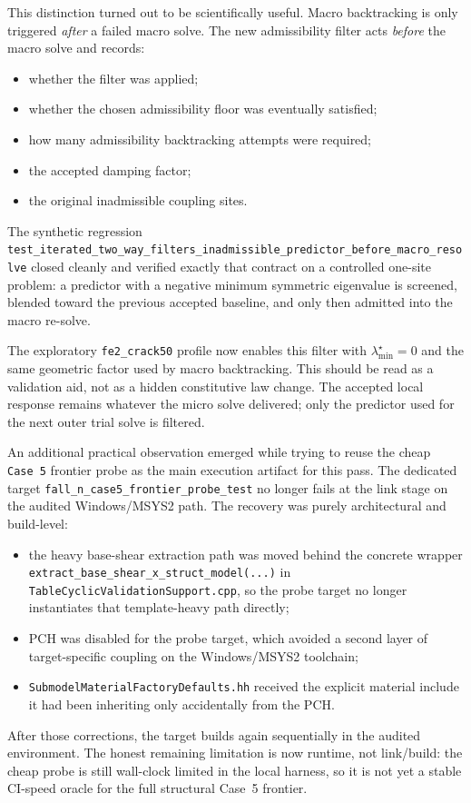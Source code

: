 This distinction turned out to be scientifically useful.  Macro backtracking is
only triggered \emph{after} a failed macro solve.  The new admissibility filter
acts \emph{before} the macro solve and records:
\begin{itemize}
  \item whether the filter was applied;
  \item whether the chosen admissibility floor was eventually satisfied;
  \item how many admissibility backtracking attempts were required;
  \item the accepted damping factor;
  \item the original inadmissible coupling sites.
\end{itemize}
The synthetic regression
\texttt{test\_iterated\_two\_way\_filters\_inadmissible\_predictor\_before\_macro\_resolve}
closed cleanly and verified exactly that contract on a controlled one-site
problem: a predictor with a negative minimum symmetric eigenvalue is screened,
blended toward the previous accepted baseline, and only then admitted into the
macro re-solve.

The exploratory \texttt{fe2\_crack50} profile now enables this filter with
\(\lambda_{\min}^{\star}=0\) and the same geometric factor used by macro
backtracking.  This should be read as a validation aid, not as a hidden
constitutive law change.  The accepted local response remains whatever the
micro solve delivered; only the predictor used for the next outer trial solve
is filtered.

An additional practical observation emerged while trying to reuse the cheap
\texttt{Case~5} frontier probe as the main execution artifact for this pass.
The dedicated target \texttt{fall\_n\_case5\_frontier\_probe\_test} no longer
fails at the link stage on the audited Windows/MSYS2 path.  The recovery was
purely architectural and build-level:
\begin{itemize}
  \item the heavy base-shear extraction path was moved behind the concrete
    wrapper \texttt{extract\_base\_shear\_x\_struct\_model(...)} in
    \texttt{TableCyclicValidationSupport.cpp}, so the probe target no longer
    instantiates that template-heavy path directly;
  \item PCH was disabled for the probe target, which avoided a second layer of
    target-specific coupling on the Windows/MSYS2 toolchain;
  \item \texttt{SubmodelMaterialFactoryDefaults.hh} received the explicit
    material include it had been inheriting only accidentally from the PCH.
\end{itemize}
After those corrections, the target builds again sequentially in the audited
environment.  The honest remaining limitation is now runtime, not link/build:
the cheap probe is still wall-clock limited in the local harness, so it is not
yet a stable CI-speed oracle for the full structural Case~5 frontier.

